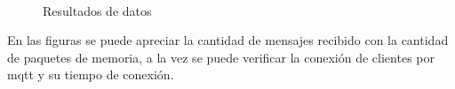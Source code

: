 \begin{figure}[hpt]
    \centering
    \caption{Resultados de datos}
            \par        %
        \\
    \label{fig:res2}
\end{figure}

En las figuras se puede apreciar la cantidad de mensajes recibido con la cantidad de paquetes de memoria, a la vez se puede verificar la conexión de clientes por \acrshort{mqtt} y su tiempo de conexión.